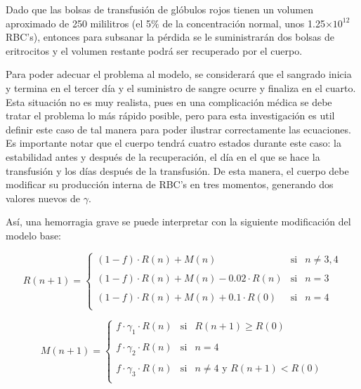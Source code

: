 Dado que las bolsas de transfusión de glóbulos rojos tienen un volumen aproximado de 250 mililitros (el 5$\%$ de la concentración normal, unos 1.25$\times 10^{12}$ RBC's), entonces para subsanar la pérdida se le suministrarán dos bolsas de eritrocitos y el volumen restante podrá ser recuperado por el cuerpo.

Para poder adecuar el problema al modelo, se considerará que el sangrado inicia y termina en el tercer día y el suministro de sangre ocurre y finaliza en el cuarto. Esta situación no es muy realista, pues en una complicación médica se debe tratar el problema lo más rápido posible, pero para esta investigación es util definir este caso de tal manera para poder ilustrar correctamente las ecuaciones. Es importante notar que el cuerpo tendrá cuatro estados durante este caso: la estabilidad antes y después de la recuperación, el día en el que se hace la transfusión y los días después de la transfusión. De esta manera, el cuerpo debe modificar su producción interna de RBC's en tres momentos, generando dos valores nuevos de $\gamma$.

Así, una hemorragia grave se puede interpretar con la siguiente modificación del modelo base:

$$R(n+1)= \left\{ \begin{array}{lcc} (1-f)\cdot R(n)+M(n) & \textrm{si} & n \neq 3,4 \\ \\ (1-f)\cdot R(n)+M(n)-0.02\cdot R(n) & \textrm{si} & n = 3 \\ \\ (1-f)\cdot R(n)+M(n)+0.1\cdot R(0) & \textrm{si} & n = 4 \\ \end{array} \right.$$

$$M(n+1)=\left\{ \begin{array}{lcc} f\cdot \gamma_1 \cdot R(n) & \textrm{si} & R(n+1) \geq R(0) \\ \\ f\cdot \gamma_2\cdot R(n) & \textrm{si} & n = 4 \\ \\ f\cdot \gamma_3\cdot R(n) & \textrm{si} & n \neq 4\textrm{ y } R(n+1)<R(0)\\ \end{array} \right.$$

